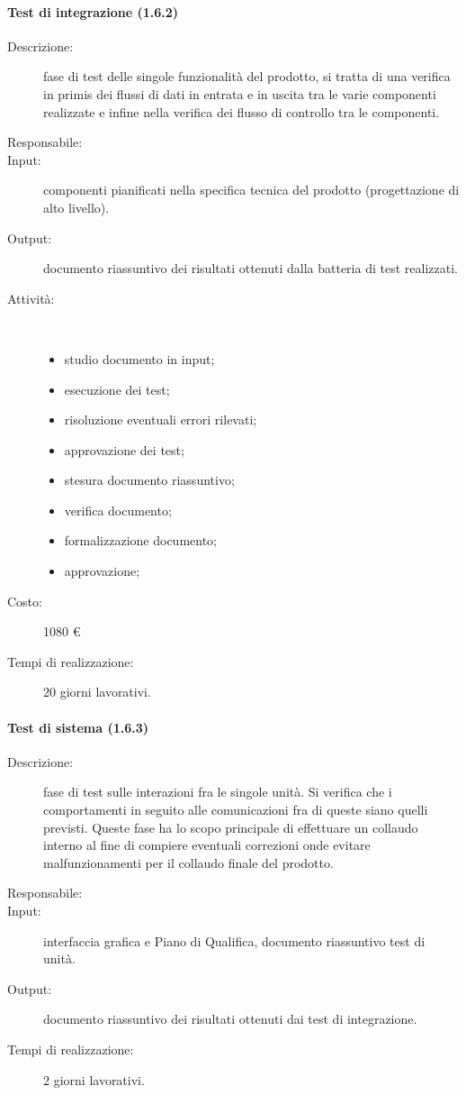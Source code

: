 \begin{description}
\paragraph{Test di integrazione (1.6.2)}
\begin{description}
\item[Descrizione:] fase di test delle singole funzionalit\`{a} del prodotto, si tratta di una verifica in primis dei flussi di dati in entrata e in uscita tra le varie componenti realizzate e infine nella verifica dei flusso di controllo tra le componenti.
\item[Responsabile:] 
\item[Input:] componenti pianificati nella specifica tecnica del prodotto (progettazione di alto livello).
\item[Output:] documento riassuntivo dei risultati ottenuti dalla batteria di test realizzati.
\item[Attività:]\mbox{}\\[-1.5\baselineskip]
	\begin{itemize}
	\item studio documento in input;
	\item esecuzione dei test;
	\item risoluzione eventuali errori rilevati;
	\item approvazione dei test;
	\item stesura documento riassuntivo;
	\item verifica documento;
	\item formalizzazione documento;
	\item approvazione;
	\end{itemize}
\item[Costo:] 1080 \euro{}
\item[Tempi di realizzazione:] 20 giorni lavorativi.
\end{description}

\paragraph{Test di sistema (1.6.3)}  
\begin{description}
\item[Descrizione:] fase di test sulle interazioni fra le singole unit\`{a}. Si verifica che i comportamenti in seguito alle comunicazioni fra di queste siano quelli previsti. Queste fase ha lo scopo principale di effettuare un collaudo interno al fine di compiere eventuali correzioni onde evitare malfunzionamenti per il collaudo finale del prodotto.
\item[Responsabile:] 
\item[Input:] interfaccia grafica e Piano di Qualifica, documento riassuntivo test di unit\`{a}.
\item[Output:] documento riassuntivo dei risultati ottenuti dai test di integrazione.
\item[Tempi di realizzazione:] 2 giorni lavorativi.
\end{description}


\end{description}
